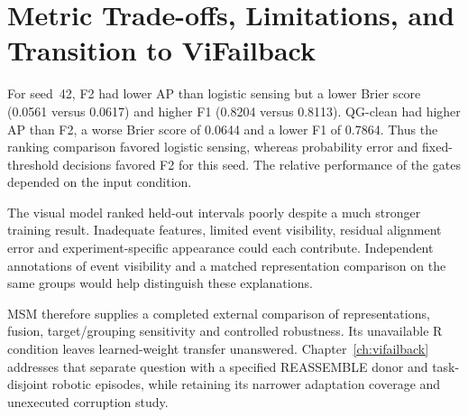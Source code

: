 \section{Metric Trade-offs, Limitations, and Transition to ViFailback}
For seed~42, F2 had lower AP than logistic sensing but a lower Brier score (0.0561
versus 0.0617) and higher F1 (0.8204 versus 0.8113). QG-clean had higher AP than
F2, a worse Brier score of 0.0644 and a lower F1 of 0.7864. Thus the ranking
comparison favored logistic sensing, whereas probability error and fixed-threshold
decisions favored F2 for this seed. The relative performance of the gates depended on
the input condition.

The visual model ranked held-out intervals poorly despite a much stronger training
result. Inadequate features, limited event visibility, residual alignment error and
experiment-specific appearance could each contribute. Independent annotations of event
visibility and a matched representation comparison on the same groups would help
distinguish these explanations.

MSM therefore supplies a completed external comparison of representations, fusion,
target/grouping sensitivity and controlled robustness. Its unavailable R condition
leaves learned-weight transfer unanswered. Chapter~\ref{ch:vifailback} addresses that
separate question with a specified REASSEMBLE donor and task-disjoint robotic episodes,
while retaining its narrower adaptation coverage and unexecuted corruption study.
